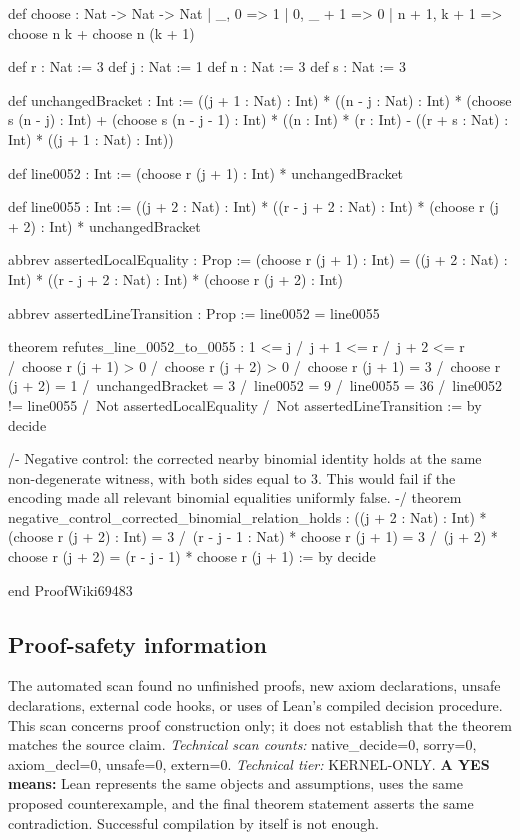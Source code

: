 \documentclass[11pt]{article}
\begin{document}
\begin{Vlean}
def choose : Nat -> Nat -> Nat
  | _, 0 => 1
  | 0, _ + 1 => 0
  | n + 1, k + 1 => choose n k + choose n (k + 1)

def r : Nat := 3
def j : Nat := 1
def n : Nat := 3
def s : Nat := 3

def unchangedBracket : Int :=
  ((j + 1 : Nat) : Int) * ((n - j : Nat) : Int) *
    (choose s (n - j) : Int) +
  (choose s (n - j - 1) : Int) *
    ((n : Int) * (r : Int) -
      ((r + s : Nat) : Int) * ((j + 1 : Nat) : Int))

def line0052 : Int :=
  (choose r (j + 1) : Int) * unchangedBracket

def line0055 : Int :=
  ((j + 2 : Nat) : Int) * ((r - j + 2 : Nat) : Int) *
    (choose r (j + 2) : Int) * unchangedBracket

abbrev assertedLocalEquality : Prop :=
  (choose r (j + 1) : Int) =
    ((j + 2 : Nat) : Int) * ((r - j + 2 : Nat) : Int) *
      (choose r (j + 2) : Int)

abbrev assertedLineTransition : Prop :=
  line0052 = line0055

theorem refutes_line_0052_to_0055 :
    1 <= j /\
    j + 1 <= r /\
    j + 2 <= r /\
    choose r (j + 1) > 0 /\
    choose r (j + 2) > 0 /\
    choose r (j + 1) = 3 /\
    choose r (j + 2) = 1 /\
    unchangedBracket = 3 /\
    line0052 = 9 /\
    line0055 = 36 /\
    line0052 != line0055 /\
    Not assertedLocalEquality /\
    Not assertedLineTransition := by
  decide

/- Negative control: the corrected nearby binomial identity holds at the
same non-degenerate witness, with both sides equal to 3.  This would fail if
the encoding made all relevant binomial equalities uniformly false. -/
theorem negative_control_corrected_binomial_relation_holds :
    ((j + 2 : Nat) : Int) * (choose r (j + 2) : Int) = 3 /\
    (r - j - 1 : Nat) * choose r (j + 1) = 3 /\
    (j + 2) * choose r (j + 2) =
      (r - j - 1) * choose r (j + 1) := by
  decide

end ProofWiki69483

\end{Vlean}
\subsection*{Proof-safety information}
The automated scan found no unfinished proofs, new axiom declarations, unsafe declarations, external code hooks, or uses of Lean's compiled decision procedure. This scan concerns proof construction only; it does not establish that the theorem matches the source claim.
\textit{Technical scan counts:} native\_decide=0, sorry=0, axiom\_decl=0, unsafe=0, extern=0. \textit{Technical tier:} KERNEL-ONLY.
\textbf{A YES means:} Lean represents the same objects and assumptions, uses the same proposed counterexample, and the final theorem statement asserts the same contradiction. Successful compilation by itself is not enough.
\clearpage
\end{document}
